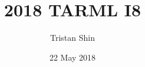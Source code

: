 \documentclass[a4paper, 12pt]{article}
\title{2018 TARML I8}
\author{Tristan Shin}
\date{22 May 2018}
\begin{document}
\maketitle



\hrulefill

\begin{solution}

\end{solution}
\end{document}
